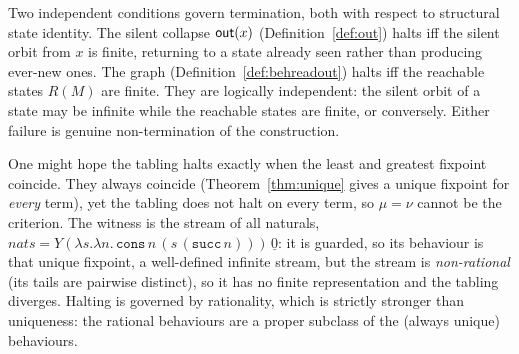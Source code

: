 \begin{remark}\label{rem:tworationalities}
  Two independent conditions govern termination, both with respect to structural state identity. The
  silent collapse $\mathsf{out}(x)$ (Definition~\ref{def:out}) halts iff the silent orbit from $x$ is finite,
  returning to a state already seen rather than producing ever-new ones. The graph
  (Definition~\ref{def:behreadout}) halts iff the reachable states $R(M)$ are finite. They are logically
  independent: the silent orbit of a state may be infinite while the reachable states are finite, or
  conversely. Either failure is genuine non-termination of the construction.
\end{remark}

\begin{remark}\label{rem:notmunu}
  One might hope the tabling halts exactly when the least and greatest fixpoint coincide. They always
  coincide (Theorem~\ref{thm:unique} gives a unique fixpoint for \emph{every} term), yet the tabling does
  not halt on every term, so $\mu=\nu$ cannot be the criterion. The witness is the stream of all
  naturals, $\mathit{nats} = Y(\lambda s.\lambda n.\,\mathtt{cons}\,n\,(s\,(\mathtt{succ}\,n)))\,\underline{0}$:
  it is guarded, so its behaviour is that unique fixpoint, a well-defined infinite stream, but the stream
  is \emph{non-rational} (its tails are pairwise distinct), so it has no finite representation and the
  tabling diverges. Halting is governed by rationality, which is strictly stronger than uniqueness: the
  rational behaviours are a proper subclass of the (always unique) behaviours.
\end{remark}

